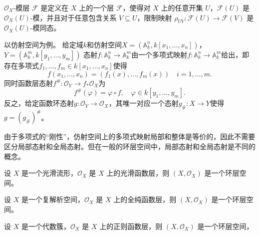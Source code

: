 \documentclass[12pt,a4paper]{ctexrep}   %
\begin{document}
\begin{definition}
    $\mathcal{O}_X$-模层 $\mathcal{F}$ 是定义在 $X$ 上的一个层 $\mathcal{F}$，使得对 $X$ 上的任意开集 $U$，$\mathcal{F}(U)$ 是 $\mathcal{O}_X(U)$-模，并且对于任意包含关系 $V\subseteq U$，限制映射 $\rho_{UV}:\mathcal{F}(U)\to \mathcal{F}(V)$ 是 $\mathcal{O}_X(U)$-模同态。
\end{definition}


以仿射空间为例。 给定域$k$和仿射空间$X=\left(\mathbb{A}_k^n,k[x_1,\ldots,x_n]\right)$，$Y=\left(\mathbb{A}_k^m,k[y_1,\ldots,y_m]\right)$
态射$f:\mathbb{A}^n_k \rightarrow \mathbb{A}^m_k$由一个多项式映射$f:\mathbb{A}^n_k\rightarrow \mathbb{A}^m_k$给出，即存在多项式$f_1,\ldots,f_m\in k[x_1,\ldots,x_n]$使得
\begin{equation*}
    f(x_1,\ldots,x_n)=(f_1(x),\ldots,f_m(x)) \quad i=1,\ldots,m.
\end{equation*}
同时函数层态射$f^\#:\mathcal{O}_Y\rightarrow f_*\mathcal{O}_X$为
\begin{equation*}
    f^\#(\varphi)=\varphi\circ f , \quad \varphi \in k[y_1,\ldots,y_m].
\end{equation*}
反之，给定函数环态射$g:\mathcal{O}_Y\rightarrow \mathcal{O}_X$，其唯一对应一个态射$g_{\#}:X\rightarrow Y$使得$g=(g_{\#})^\#$。
\begin{remark}
    由于多项式的“刚性”，仿射空间上的多项式映射局部和整体是等价的，因此不需要区分局部态射和全局态射。但在一般的环层空间中，局部态射和全局态射是不同的概念。
\end{remark}



\begin{example}
    设 $X$ 是一个光滑流形，$\mathcal{O}_X$ 是 $X$ 上的光滑函数层，则 $(X,\mathcal{O}_X)$ 是一个环层空间。
\end{example}
\begin{example}
    设 $X$ 是一个复解析空间，$\mathcal{O}_X$ 是 $X$ 上的全纯函数层，则 $(X,\mathcal{O}_X)$ 是一个环层空间。
\end{example}

\begin{example}
    设 $X$ 是一个代数簇，$\mathcal{O}_X$ 是 $X$ 上的正则函数层，则 $(X,\mathcal{O}_X)$ 是一个环层空间，
\end{example}
\end{document}
